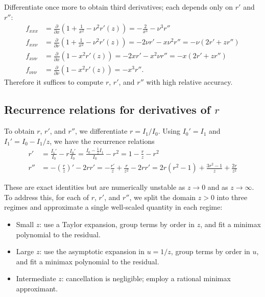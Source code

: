 \documentclass{article}
\begin{document}
Differentiate once more to obtain third derivatives;
each depends only on $r'$ and $r''$:
%
\begin{align}
  f_{xxx}       & = \frac{\partial}{\partial x}\left(1+\frac{1}{x^2}-\nu^2 r'(z)\right) = -\frac{2}{x^3} - \nu^3 r'' \label{eq:third-derivatives-unsimplified-x-x-x}                                 \\
  f_{xx\nu}     & = \frac{\partial}{\partial \nu}\left(1+\frac{1}{x^2}-\nu^2 r'(z)\right) = -2\nu r' - x\nu^2 r'' = -\nu(2r' + z r'')              \label{eq:third-derivatives-unsimplified-x-x-nu}  \\
  f_{x\nu\nu}   & = \frac{\partial}{\partial x}\left(1 - x^2 r'(z)\right) = -2x r' - x^2\nu r'' = -x(2r' + z r'')                                  \label{eq:third-derivatives-unsimplified-x-nu-nu} \\
  f_{\nu\nu\nu} & = \frac{\partial}{\partial \nu}\left(1 - x^2 r'(z)\right) = -x^3 r''. \label{eq:third-derivatives-unsimplified-nu-nu-nu}
\end{align}
%
Therefore it suffices to compute $r$, $r'$, and $r''$ with high relative accuracy.

\subsection{Recurrence relations for derivatives of $r$}

To obtain $r$, $r'$, and $r''$, we differentiate $r=I_1/I_0$.
Using $I_0'=I_1$ and $I_1'=I_0 - I_1/z$, we have the recurrence relations
%
\begin{align}
  r'  & = \frac{I_1'}{I_0} - r\frac{I_0'}{I_0} = \frac{I_0 - \frac{1}{z} I_1}{I_0} - r^2 = 1 - \frac{r}{z} - r^2 \label{eq:r-prime-recurrence}                                           \\
  r'' & = -\left(\frac{r}{z}\right)' - 2 r r' = -\frac{r'}{z} + \frac{r}{z^2} - 2 r r' = 2 r (r^2 - 1) + \frac{3 r^2 - 1}{z} + \frac{2 r}{z^2} \label{eq:r-second-derivative-recurrence}
\end{align}

These are exact identities but are numerically unstable as $z \to 0$ and as $z \to \infty$.
To address this, for each of $r$, $r'$, and $r''$, we split the domain $z>0$ into three regimes and approximate a single well-scaled quantity in each regime:
\begin{itemize}
  \item Small $z$: use a Taylor expansion, group terms by order in $z$, and fit a minimax polynomial to the residual.
  \item Large $z$: use the asymptotic expansion in $u = 1/z$, group terms by order in $u$, and fit a minimax polynomial to the residual.
  \item Intermediate $z$: cancellation is negligible; employ a rational minimax approximant.
\end{itemize}
\end{document}
